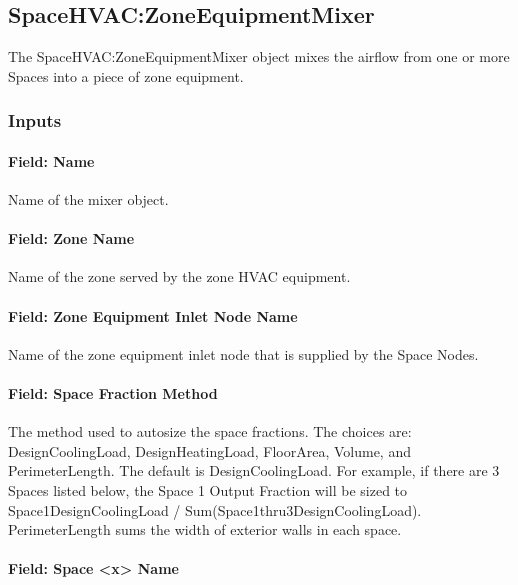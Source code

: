 \subsection{SpaceHVAC:ZoneEquipmentMixer}\label{spacehvaczoneequipmentmixer}

The SpaceHVAC:ZoneEquipmentMixer object mixes the airflow from one or more Spaces into a piece of zone equipment.

\subsubsection{Inputs}\label{inputs-1-052-seqmixer}

\paragraph{Field: Name}\label{field-seqmixer-name-015}

Name of the mixer object.

\paragraph{Field: Zone Name}\label{field-seqmixer-zone-name}

Name of the zone served by the zone HVAC equipment.

\paragraph{Field: Zone Equipment Inlet Node Name}\label{field-seqmixer-zone-equipment-inlet-node-name}

Name of the zone equipment inlet node that is supplied by the Space Nodes.

\paragraph{Field: Space Fraction Method}\label{field-seqmixer-space-sizing-basis}

The method used to autosize the space fractions. The choices are: DesignCoolingLoad, DesignHeatingLoad, FloorArea, Volume, and PerimeterLength. The default is DesignCoolingLoad.
For example, if there are 3 Spaces listed below, the Space 1 Output Fraction will be sized to Space1DesignCoolingLoad / Sum(Space1thru3DesignCoolingLoad). PerimeterLength sums the width of exterior walls in each space.

\paragraph{Field: Space \textless{}x\textgreater{} Name}\label{field-seqmixer-space-name}

